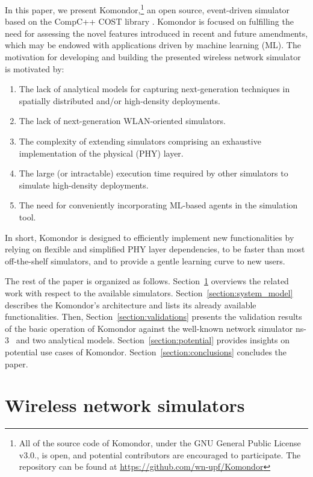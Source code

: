 \documentclass[conference]{IEEEtran}
\begin{document}
	In this paper, we present Komondor,\footnote{All of the source code of Komondor, under the GNU General Public License v3.0., is open, and potential contributors are encouraged to participate. The repository can be found at \url{https://github.com/wn-upf/Komondor}} an open source, event-driven simulator based on the CompC++ COST library \cite{chen2002reusing}. Komondor is focused on fulfilling the need for assessing the novel features introduced in recent and future amendments, which may be endowed with applications driven by machine learning (ML). The motivation for developing and building the presented wireless network simulator is motivated by: 
	\begin{enumerate}[label=\roman*)]
		\item The lack of analytical models for capturing next-generation techniques in spatially distributed and/or high-density deployments.
		\item The lack of next-generation WLAN-oriented simulators.
		\item The complexity of extending simulators comprising an exhaustive implementation of the physical (PHY) layer.
		\item The large (or intractable) execution time required by other simulators to simulate high-density deployments.
		\item The need for conveniently incorporating ML-based agents in the simulation tool.
	\end{enumerate}
	In short, Komondor is designed to efficiently implement new functionalities by relying on flexible and simplified PHY layer dependencies, to be faster than most off-the-shelf simulators, and to provide a gentle learning curve to new users.
	
	The rest of the paper is organized as follows. Section~\ref{section:related_work} overviews the related work with respect to the available simulators. Section~\ref{section:system_model} describes the Komondor's architecture and lists its already available functionalities. Then, Section~\ref{section:validations} presents the validation results of the basic operation of Komondor against the well-known network simulator ns-3~\cite{ns3_url} and two analytical models. Section~\ref{section:potential} provides insights on potential use cases of Komondor. Section~\ref{section:conclusions} concludes the paper.
	
	\section{Wireless network simulators}
	\label{section:related_work}
	
\end{document}
